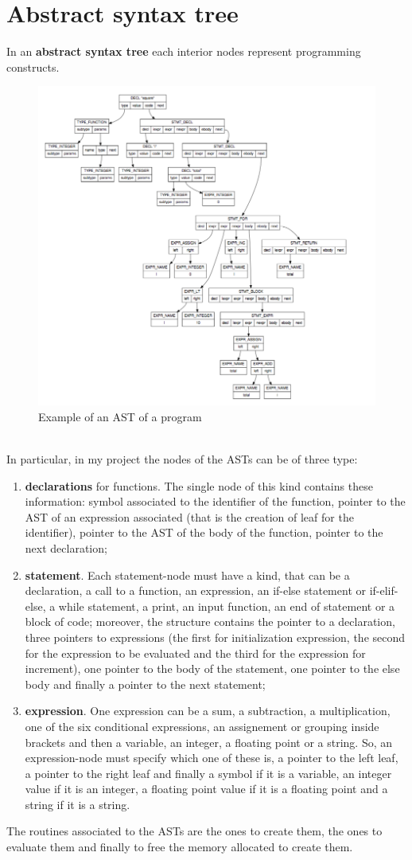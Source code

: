 \documentclass[a4paper,12pt,,titlepage,openright]{report}
\begin{document}
\section{Abstract syntax tree}
In an \textbf{abstract syntax tree} each interior nodes represent programming constructs.
\begin{figure}[htbp]
\centering
\includegraphics[width=.7\textwidth]{ast.png}
\caption{Example of an AST of a program}
\end{figure}
\\
In particular, in my project the nodes of the ASTs can be of three type:
\begin{enumerate}
\item \textbf{declarations} for functions. The single node of this kind contains these information: symbol associated to the identifier of the function, pointer to the AST of an expression associated (that is the creation of leaf for the identifier), pointer to the AST of the body of the function, pointer to the next declaration;
\item \textbf{statement}. Each statement-node must have a kind, that can be a declaration, a call to a function, an expression, an if-else statement or if-elif-else, a while statement, a print, an input function, an end of statement or a block of code; moreover, the structure contains the pointer to a declaration, three pointers to expressions (the first for initialization expression, the second for the expression to be evaluated and the third for the expression for increment), one pointer to the body of the statement, one pointer to the else body and finally a pointer to the next statement;
\item \textbf{expression}. One expression can be a sum, a subtraction, a multiplication, one of the six conditional expressions, an assignement or grouping inside brackets and then a variable, an integer, a floating point or a string. So, an expression-node must specify which one of these is, a pointer to the left leaf, a pointer to the right leaf and finally a symbol if it is a variable, an integer value if it is an integer, a floating point value if it is a floating point and a string if it is a string.
\end{enumerate}
The routines associated to the ASTs are the ones to create them, the ones to evaluate them and finally to free the memory allocated to create them.
\end{document}

